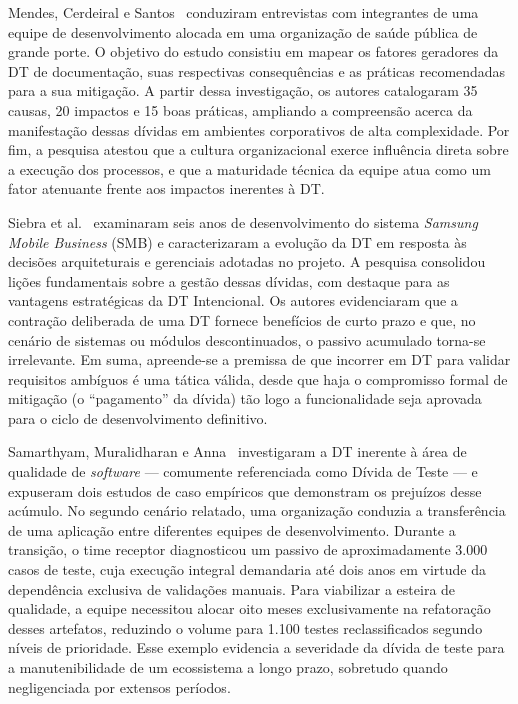 Mendes, Cerdeiral e Santos~\cite{16} conduziram entrevistas com integrantes de uma equipe de desenvolvimento alocada em uma organização de saúde pública de grande porte. O objetivo do estudo consistiu em mapear os fatores geradores da DT de documentação, suas respectivas consequências e as práticas recomendadas para a sua mitigação. A partir dessa investigação, os autores catalogaram 35 causas, 20 impactos e 15 boas práticas, ampliando a compreensão acerca da manifestação dessas dívidas em ambientes corporativos de alta complexidade. Por fim, a pesquisa atestou que a cultura organizacional exerce influência direta sobre a execução dos processos, e que a maturidade técnica da equipe atua como um fator atenuante frente aos impactos inerentes à DT.

Siebra et al.~\cite{17} examinaram seis anos de desenvolvimento do sistema \textit{Samsung Mobile Business} (SMB) e caracterizaram a evolução da DT em resposta às decisões arquiteturais e gerenciais adotadas no projeto. A pesquisa consolidou lições fundamentais sobre a gestão dessas dívidas, com destaque para as vantagens estratégicas da DT Intencional. Os autores evidenciaram que a contração deliberada de uma DT fornece benefícios de curto prazo e que, no cenário de sistemas ou módulos descontinuados, o passivo acumulado torna-se irrelevante. Em suma, apreende-se a premissa de que incorrer em DT para validar requisitos ambíguos é uma tática válida, desde que haja o compromisso formal de mitigação (o ``pagamento'' da dívida) tão logo a funcionalidade seja aprovada para o ciclo de desenvolvimento definitivo.

Samarthyam, Muralidharan e Anna~\cite{18} investigaram a DT inerente à área de qualidade de \textit{software} — comumente referenciada como Dívida de Teste — e expuseram dois estudos de caso empíricos que demonstram os prejuízos desse acúmulo. No segundo cenário relatado, uma organização conduzia a transferência de uma aplicação entre diferentes equipes de desenvolvimento. Durante a transição, o time receptor diagnosticou um passivo de aproximadamente 3.000 casos de teste, cuja execução integral demandaria até dois anos em virtude da dependência exclusiva de validações manuais. Para viabilizar a esteira de qualidade, a equipe necessitou alocar oito meses exclusivamente na refatoração desses artefatos, reduzindo o volume para 1.100 testes reclassificados segundo níveis de prioridade. Esse exemplo evidencia a severidade da dívida de teste para a manutenibilidade de um ecossistema a longo prazo, sobretudo quando negligenciada por extensos períodos.


